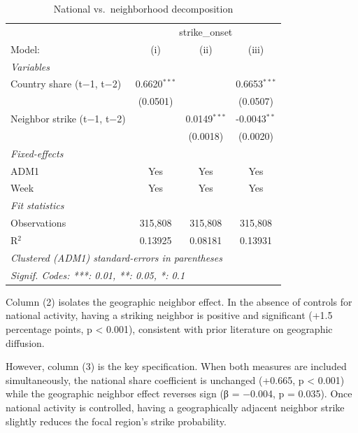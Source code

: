 \documentclass[
  11pt,
]{article}
\begin{document}
\begingroup
\centering
\begin{table}
\caption{National vs.~neighborhood decomposition}\tabularnewline

\centering
\begin{tabular}{lccc}
   \hline
    & \multicolumn{3}{c}{strike\_onset}\\
   Model:                         & (i)            & (ii)           & (iii)\\  
   \midrule
   \emph{Variables}\\
   Country share (t$-$1, t$-$2)   & 0.6620$^{***}$ &                & 0.6653$^{***}$\\   
                                  & (0.0501)       &                & (0.0507)\\   
   Neighbor strike (t$-$1, t$-$2) &                & 0.0149$^{***}$ & -0.0043$^{**}$\\   
                                  &                & (0.0018)       & (0.0020)\\   
   \midrule
   \emph{Fixed-effects}\\
   ADM1                           & Yes            & Yes            & Yes\\  
   Week                           & Yes            & Yes            & Yes\\  
   \midrule
   \emph{Fit statistics}\\
   Observations                   & 315,808        & 315,808        & 315,808\\  
   R$^2$                          & 0.13925        & 0.08181        & 0.13931\\  
   \hline
   \multicolumn{4}{l}{\emph{Clustered (ADM1) standard-errors in parentheses}}\\
   \multicolumn{4}{l}{\emph{Signif. Codes: ***: 0.01, **: 0.05, *: 0.1}}\\
\end{tabular}
\end{table}

\par\endgroup

Column (2) isolates the geographic neighbor effect. In the absence of
controls for national activity, having a striking neighbor is positive
and significant (+1.5 percentage points, p \textless{} 0.001),
consistent with prior literature on geographic diffusion.

However, column (3) is the key specification. When both measures are
included simultaneously, the national share coefficient is unchanged
(+0.665, p \textless{} 0.001) while the geographic neighbor effect
reverses sign (β = −0.004, p = 0.035). Once national activity is
controlled, having a geographically adjacent neighbor strike slightly
reduces the focal region's strike probability.
\end{document}
